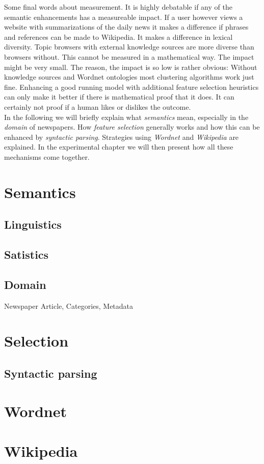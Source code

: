 Some final words about measurement. It is highly debatable if any of the semantic enhancements has a measureable impact. If a user however views a website with summarizations of the daily news it makes a difference if phrases and references can be made to Wikipedia. It makes a difference in lexical diversity. Topic browsers with external knowledge sources are more diverse than browsers without. This cannot be measured in a mathematical way. The impact might be very small. The reason, the impact is so low is rather obvious: Without knowledge sources and Wordnet ontologies most clustering algorithms work just fine. Enhancing a good running model with additional feature selection heuristics can only make it better if there is mathematical proof that it does. It can certainly not proof if a human likes or dislikes the outcome.\\

In the following we will briefly explain what \emph{semantics} mean, especially in the \emph{domain} of newspapers. How \emph{feature selection} generally works and how this can be enhanced by \emph{syntactic parsing}. Strategies using \emph{Wordnet} and \emph{Wikipedia} are explained. In the experimental chapter we will then present how all these mechanisms come together.


\section{Semantics}
  \subsection{Linguistics}
  \subsection{Satistics}
  \subsection{Domain}
    Newspaper Article, Categories, Metadata

\section{Selection}
  \subsection{Syntactic parsing}
  
\section{Wordnet}

\section{Wikipedia}
  

